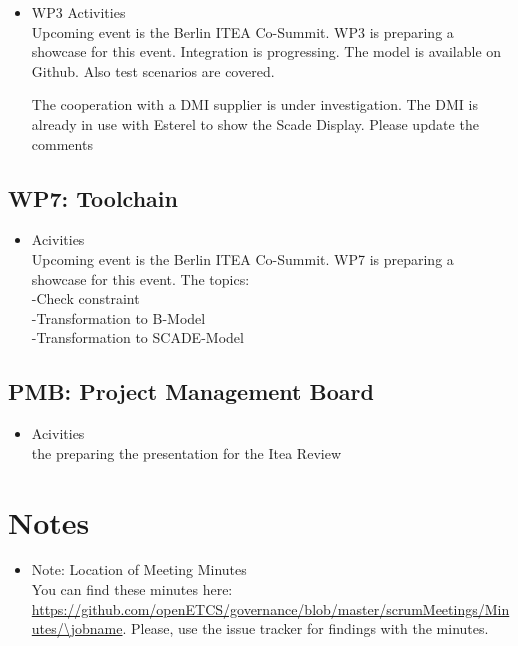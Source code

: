 \documentclass[a4paper, 11pt]{article}
\begin{document}
\begin{itemize}
\item WP3 Activities\\
Upcoming event is the Berlin ITEA Co-Summit. WP3 is preparing a showcase for this event.
Integration is progressing. The model is available on Github. Also test scenarios are covered.

The cooperation with a DMI supplier is under investigation. The DMI is already in use with Esterel to show the Scade Display. 
Please update the comments


\end{itemize}

\subsection{WP7: Toolchain}

\begin{itemize}
\item Acivities\\
Upcoming event is the Berlin ITEA Co-Summit.
WP7 is preparing a showcase for this event.
The topics:\\
-Check constraint\\
-Transformation to B-Model\\
-Transformation to SCADE-Model\\

\end{itemize}

\subsection{PMB: Project Management Board}
\begin{itemize}
\item Acivities\\

 the preparing the presentation for the Itea Review
\end{itemize}
\section{Notes}
\begin{itemize}

\item Note: Location of Meeting Minutes\\
You can find these minutes here: \url{https://github.com/openETCS/governance/blob/master/scrumMeetings/Minutes/\jobname}. Please, use the issue tracker for findings with the minutes.

\end{itemize}
\end{document}
